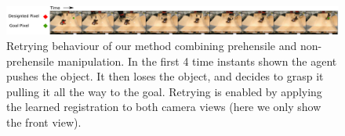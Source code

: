 \begin{figure}
	\vspace{-0.1in}
	\centering
	\includegraphics[width=1.0\textwidth]{images/pick_place_plush.pdf}
	\caption{\small{Retrying behaviour of our method combining prehensile and non-prehensile manipulation. In the first 4 time instants shown the agent pushes the object. It then loses the object, and decides to grasp it pulling it all the way to the goal. Retrying is enabled by applying the learned registration to both camera views (here we only show the front view).}}
	\label{fig:push_grasp}
	\vspace{-0.2in}
\end{figure}





